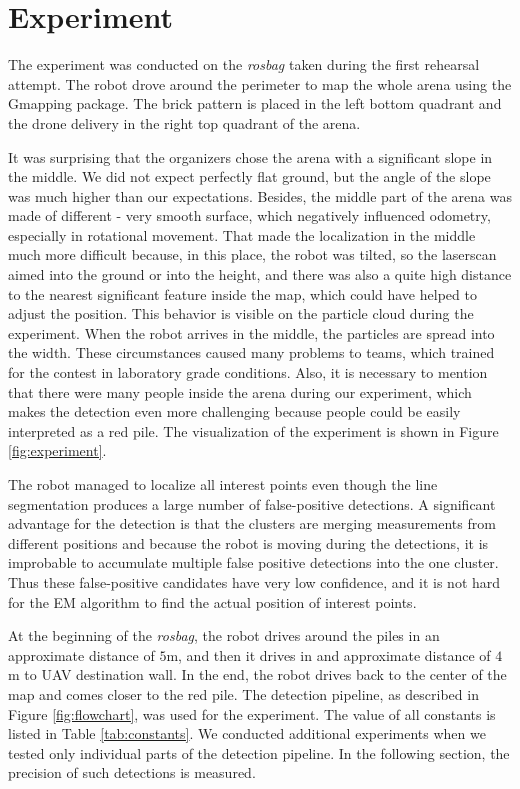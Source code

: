 \chapter{Experiment}
\label{ch:experiment}
The experiment was conducted on the \textit{rosbag} taken during the first rehearsal attempt. The robot drove around the perimeter to map the whole arena using the Gmapping package. The brick pattern is placed in the left bottom quadrant and the drone delivery in the right top quadrant of the arena.

 It was surprising that the organizers chose the arena with a significant slope in the middle. We did not expect perfectly flat ground, but the angle of the slope was much higher than our expectations. Besides, the middle part of the arena was made of different - very smooth surface, which negatively influenced odometry, especially in rotational movement. That made the localization in the middle much more difficult because, in this place, the robot was tilted, so the laserscan aimed into the ground or into the height, and there was also a quite high distance to the nearest significant feature inside the map, which could have helped to adjust the position. This behavior is visible on the particle cloud during the experiment. When the robot arrives in the middle, the particles are spread into the width. These circumstances caused many problems to teams, which trained for the contest in laboratory grade conditions. Also, it is necessary to mention that there were many people inside the arena during our experiment, which makes the detection even more challenging because people could be easily interpreted as a red pile. The visualization of the experiment is shown in Figure \ref{fig:experiment}.

The robot managed to localize all interest points even though the line segmentation produces a large number of false-positive detections. A significant advantage for the detection is that the clusters are merging measurements from different positions and because the robot is moving during the detections, it is improbable to accumulate multiple false positive detections into the one cluster. Thus these false-positive candidates have very low confidence, and it is not hard for the EM algorithm to find the actual position of interest points. 

At the beginning of the \textit{rosbag}, the robot drives around the piles in an approximate distance of $5$m, and then it drives in and approximate distance of $4$m to UAV destination wall. In the end, the robot drives back to the center of the map and comes closer to the red pile. The detection pipeline, as described in Figure \ref{fig:flowchart}, was used for the experiment. The value of all constants is listed in Table \ref{tab:constants}. We conducted additional experiments when we tested only individual parts of the detection pipeline. In the following section, the precision of such detections is measured.


